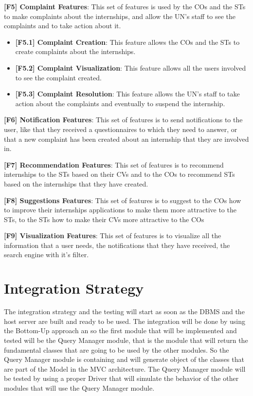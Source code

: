 \par \textbf{[F5] Complaint Features}: This set of features is used by the COs and the STs to make complaints about the
internships, and allow the UN's staff to see the complaints and to take action about it.

\begin{itemize}
    \item \textbf{[F5.1] Complaint Creation}: This feature allows the COs and the STs to create complaints about the
    internships.
    \item \textbf{[F5.2] Complaint Visualization}: This feature allows all the users involved to see the complaint 
    created.
    \item \textbf{[F5.3] Complaint Resolution}: This feature allows the UN's staff to take action about the complaints
    and eventually to suspend the internship.
\end{itemize}

\par \textbf{[F6] Notification Features}: This set of features is to send notifications to the user, like 
that they received a questionnaires to which they need to answer, or that a new complaint has been created about an internship
that they are involved in.

\par \textbf{[F7] Recommendation Features}: This set of features is to recommend internships to the STs based on their
CVs and to the COs to recommend STs based on the internships that they have created.

\par \textbf{[F8] Suggestions Features}: This set of features is to suggest to the COs how to improve their internships
applications to make them more attractive to the STs, to the STs how to make their CVs more attractive to the COs

\par \textbf{[F9] Visualization Features}: This set of features is to visualize all the information that a user needs,
the notifications that they have received, the search engine with it's filter.


\section{Integration Strategy}
\label{sec:integration-strategy}%

\par The integration strategy and the testing will start as soon as the DBMS and the host server are built and ready 
to be used. The integration will be done by using the Bottom-Up approach an so the first module that will be implemented
and tested will be the Query Manager module, that is the module that will return the fundamental classes that are going to
be used by the other modules. So the Query Manager module is containing and will generate object of the classes that are
part of the Model in the MVC architecture. The Query Manager module will be tested by using a proper Driver that will 
simulate the behavior of the other modules that will use the Query Manager module.  

